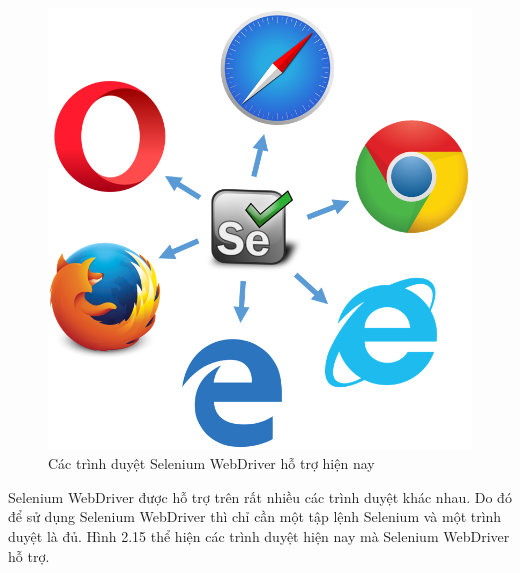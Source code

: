 \begin{center}
	\begin{figure}[htp]
		\begin{center}
			\includegraphics[width=13cm]{Chapter2/Pictures/picture215.png}
		\end{center}
		\caption{Các trình duyệt Selenium WebDriver hỗ trợ hiện nay}
		\label{refpictute215}
	\end{figure}
\end{center}

Selenium WebDriver được hỗ trợ trên rất nhiều các trình duyệt khác nhau. Do đó để sử dụng Selenium WebDriver thì chỉ cần một tập lệnh Selenium và một trình duyệt là đủ. Hình 2.15 thể hiện các trình duyệt hiện nay mà Selenium WebDriver hỗ trợ.
















